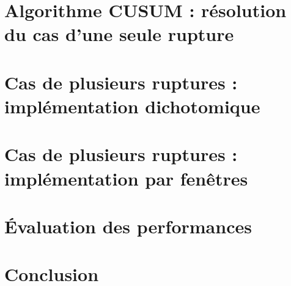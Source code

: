 \documentclass[french,12pt]{report}
\begin{document}
	\chapter{Algorithme CUSUM : résolution du cas d'une seule rupture}
	
	\chapter{Cas de plusieurs ruptures : implémentation dichotomique}
	
	\chapter{Cas de plusieurs ruptures : implémentation par fenêtres}
	
	\chapter{Évaluation des performances}
	
	\chapter{Conclusion}
\end{document}
